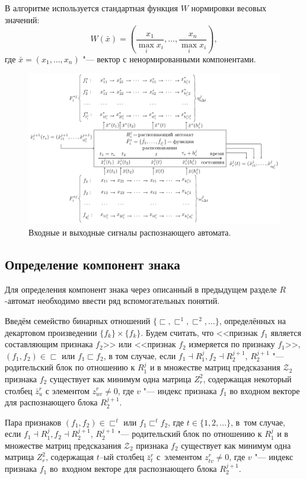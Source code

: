 \documentclass[a4paper, 12pt]{article}
\theoremstyle{plain}
\begin{document}
	В алгоритме используется стандартная функция $W$ нормировки весовых значений:
	\begin{equation}
		W(\bar x)=\left(\frac{x_1}{\max\limits_i x_i},\dots,\frac{x_n}{\max\limits_i x_i}\right),
	\end{equation} 
	где $\bar x=(x_1,\dots,x_n)$ "--- вектор с ненормированными компонентами.
	
	\begin{figure}[H]
		\centering
		\includegraphics[width=1.0\linewidth]{rb_io}
		\caption{Входные и выходные сигналы распознающего автомата.}
		\label{fig:rb_io}
	\end{figure}
	
	\subsection{Определение компонент знака}
		Для определения компонент знака через описанный в предыдущем разделе $R$-автомат необходимо ввести ряд вспомогательных понятий. 
		
		Введём семейство бинарных отношений $\{\sqsubset,\sqsubset^1,\sqsubset^2,\dots\}$, определённых на декартовом произведении $\{f_k\}\times \{f_k\}$. Будем считать, что <<признак $f_1$ является составляющим признака $f_2$>> или <<признак $f_2$ измеряется по признаку $f_1$>>, $(f_1,f_2 )\in\sqsubset$ или $f_1\sqsubset f_2$, в том случае, если $f_1\dashv R_1^j, f_2\dashv R_2^{j+1}$, $R_2^{j+1}$ "--- родительский блок по отношению к $R_1^j$ и в множестве матриц предсказания $\mathcal Z_2$ признака $f_2$ существует как минимум одна матрица $Z_r^2$, содержащая некоторый столбец $\bar z_u^r$ с элементом $z_{uv}^r\not=0$, где $v$ "--- индекс признака $f_1$ во входном векторе для распознающего блока $R_2^{j+1}$.
		
		Пара признаков $(f_1,f_2)\in\sqsubset^t$ или $f_1\sqsubset^t f_2$, где $t\in\{1,2,\dots\}$, в~том случае, если $f_1\dashv R_1^j, f_2\dashv R_2^{j+1}$, $R_2^{j+1}$ "--- родительский блок по отношению к $R_1^j$ и в множестве матриц предсказания $\mathcal Z_2$ признака $f_2$ существует как минимум одна матрица $Z_r^2$, содержащая $t$–ый столбец $\bar z_t^r$ с~элементом $z_{tv}^r\not=0$, где $v$ "--- индекс признака $f_1$ во~входном векторе для распознающего блока $R_2^{j+1}$.
		
\end{document}
